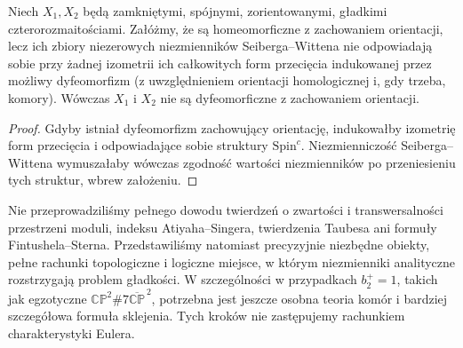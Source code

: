\begin{stwierdzenie}
Niech $X_1,X_2$ będą zamkniętymi, spójnymi,
zorientowanymi, gładkimi czterorozmaitościami.
Załóżmy, że są homeomorficzne z zachowaniem orientacji,
lecz ich zbiory niezerowych niezmienników
Seiberga--Wittena nie odpowiadają sobie przy żadnej
izometrii ich całkowitych form przecięcia indukowanej
przez możliwy dyfeomorfizm (z uwzględnieniem orientacji
homologicznej i, gdy trzeba, komory). Wówczas $X_1$
i $X_2$ nie są dyfeomorficzne z zachowaniem orientacji.
\end{stwierdzenie}

\begin{proof}
Gdyby istniał dyfeomorfizm zachowujący orientację,
indukowałby izometrię form przecięcia i odpowiadające
sobie struktury $\mathrm{Spin}^c$. Niezmienniczość
Seiberga--Wittena wymuszałaby wówczas zgodność
wartości niezmienników po przeniesieniu tych struktur,
wbrew założeniu.
\end{proof}

\begin{center}
\end{center}

\begin{uwaga}
Nie przeprowadziliśmy pełnego dowodu twierdzeń o zwartości
i transwersalności przestrzeni moduli, indeksu Atiyaha--Singera,
twierdzenia Taubesa ani formuły Fintushela--Sterna.
Przedstawiliśmy natomiast precyzyjnie niezbędne obiekty,
pełne rachunki topologiczne i logiczne miejsce, w którym
niezmienniki analityczne rozstrzygają problem gładkości.
W szczególności w przypadkach $b_2^+=1$, takich jak egzotyczne
$\mathbb{CP}^2\#7\overline{\mathbb{CP}}^{\,2}$, potrzebna
jest jeszcze osobna teoria komór i bardziej szczegółowa
formuła sklejenia. Tych kroków nie zastępujemy
rachunkiem charakterystyki Eulera.
\end{uwaga}


